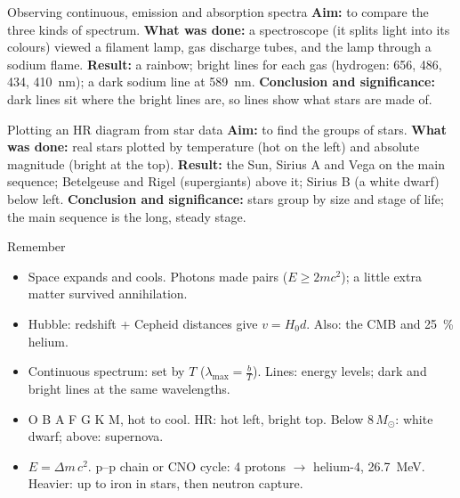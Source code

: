 \begin{experiment}{Observing continuous, emission and absorption spectra}
\textbf{Aim:} to compare the three kinds of spectrum. \textbf{What was done:} a spectroscope
(it splits light into its colours) viewed a filament lamp, gas discharge tubes, and the lamp through a sodium flame.
\textbf{Result:} a rainbow; bright lines for each gas (hydrogen: 656, 486, 434, \qty{410}{nm});
a dark sodium line at \qty{589}{nm}. \textbf{Conclusion and significance:} dark lines sit where
the bright lines are, so lines show what stars are made of.
\end{experiment}

\begin{experiment}{Plotting an HR diagram from star data}
\textbf{Aim:} to find the groups of stars. \textbf{What was done:} real stars plotted by
temperature (hot on the left) and absolute magnitude (bright at the top). \textbf{Result:}
the Sun, Sirius A and Vega on the main sequence; Betelgeuse and Rigel (supergiants) above it;
Sirius B (a white dwarf) below left. \textbf{Conclusion and significance:} stars group by size
and stage of life; the main sequence is the long, steady stage.
\end{experiment}

\begin{summarybox}{Remember}
\begin{itemize}
  \item Space expands and cools. Photons made pairs ($E \geq 2mc^2$); a little extra matter
        survived annihilation.
  \item Hubble: redshift + Cepheid distances give $v = H_0 d$. Also: the CMB and
        \qty{25}{\percent} helium.
  \item Continuous spectrum: set by $T$ ($\lambda_\mathrm{max} = \frac{b}{T}$). Lines: energy
        levels; dark and bright lines at the same wavelengths.
  \item O B A F G K M, hot to cool. HR: hot left, bright top. Below $8\,M_\odot$: white dwarf;
        above: supernova.
  \item $E = \Delta m\,c^2$. p--p chain or CNO cycle: 4 protons $\to$ helium-4,
        \qty{26.7}{MeV}. Heavier: up to iron in stars, then neutron capture.
\end{itemize}
\end{summarybox}
